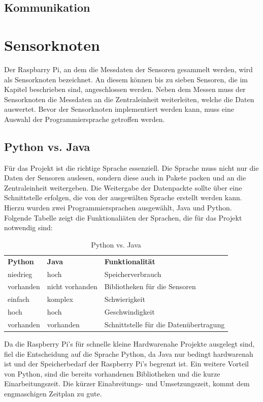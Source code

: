 \subsection{Kommunikation}

\section{Sensorknoten}
Der Raspbarry Pi, an dem die Messdaten der Sensoren gesammelt werden, wird als Sensorknoten bezeichnet. An diesem können bis zu sieben Sensoren, die im Kapitel  beschrieben sind, angeschlossen werden. Neben dem Messen muss der Sensorknoten die Messdaten an die Zentraleinheit weiterleiten, welche die Daten auswertet. Bevor der Sensorknoten implementiert werden kann, muss eine Auswahl der Programmiersprache getroffen werden.
\subsection{Python vs. Java}
Für das Projekt ist die richtige Sprache essenziell. Die Sprache muss nicht nur die Daten der Sensoren auslesen, sondern diese auch in Pakete packen und an die Zentraleinheit weitergeben. Die Weitergabe der Datenpackte sollte über eine Schnittstelle erfolgen, die von der ausgewälten Sprache erstellt werden kann. Hierzu wurden zwei Programmiersprachen ausgewählt, Java und Python. Folgende Tabelle zeigt die Funktionaliäten der Sprachen, die für das Projekt notwendig sind:\hfill

\begin{table}[h]
	\centering
	\caption{Python vs. Java}
	\label{my-label}
	\begin{tabular}{lll}
	\textbf{Python} & \textbf{Java} & \textbf{Funktionalität}  \\
	niedrieg & hoch &  Speicherverbrauch\\
	vorhanden & nicht vorhanden & Bibliotheken für die Sensoren \\
	einfach & komplex & Schwierigkeit \\
	hoch & hoch & Geschwindigkeit \\
	vorhanden & vorhanden & Schnittstelle für die Datenübertragung
	\end{tabular}
\end{table}
Da die Raspberry Pi's für schnelle kleine Hardwarenahe Projekte ausgelegt sind, fiel die Entscheidung auf die Sprache Python, da Java nur bedingt hardwarenah ist und der Speicherbedarf der Raspberry Pi's begrenzt ist. Ein weitere Vorteil von Python, sind die bereits vorhandenen Bibliotheken und die kurze Einarbeitungszeit. Die kürzer Einabreitungs- und Umsetzungszeit, kommt dem engmaschigen Zeitplan zu gute.

